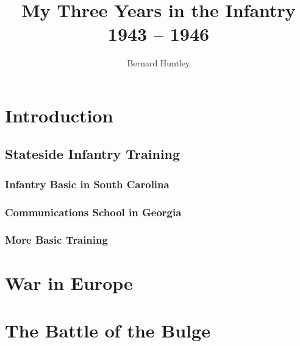 \documentclass[11pt,openany,showtrims,extrafontsizes]{memoir}
\title{My Three Years in the Infantry\\ \Large 1943 -- 1946}
\author{Bernard Huntley}
\date{}
\begin{document}


\mainmatter
\part*{Introduction}\label{introduction}

\chapter{Stateside Infantry Training}\label{stateside-infantry-training}


\section{Infantry Basic in South Carolina}\label{infantry-basic}


\section{Communications School in Georgia}\label{communications-school}


\section{More Basic Training}\label{more-basic-training}


\part*{War in Europe}\label{war-in-europe}


\part*{The Battle of the Bulge}\label{battle-of-the-bulge}

\end{document}
